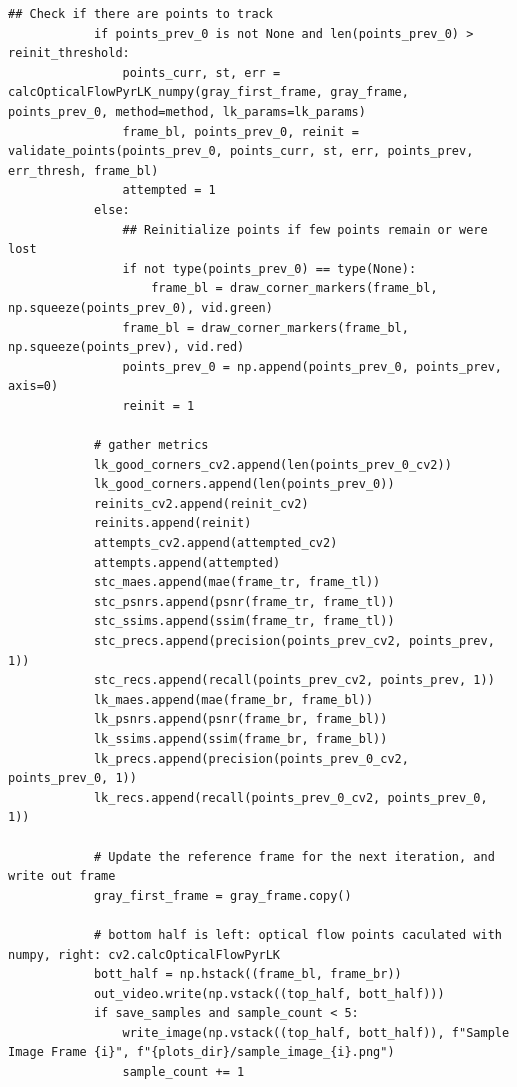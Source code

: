 \documentclass[11pt, conference, letterpaper]{IEEEtran}
\begin{document}
\begin{lstlisting}[style=python, caption={\texttt{lucas\_kanade.py}}, label={lst:lk}]
            ## Check if there are points to track
            if points_prev_0 is not None and len(points_prev_0) > reinit_threshold:
                points_curr, st, err = calcOpticalFlowPyrLK_numpy(gray_first_frame, gray_frame, points_prev_0, method=method, lk_params=lk_params)
                frame_bl, points_prev_0, reinit = validate_points(points_prev_0, points_curr, st, err, points_prev, err_thresh, frame_bl)
                attempted = 1
            else:
                ## Reinitialize points if few points remain or were lost
                if not type(points_prev_0) == type(None):
                    frame_bl = draw_corner_markers(frame_bl, np.squeeze(points_prev_0), vid.green)
                frame_bl = draw_corner_markers(frame_bl, np.squeeze(points_prev), vid.red)
                points_prev_0 = np.append(points_prev_0, points_prev, axis=0)
                reinit = 1
            
            # gather metrics
            lk_good_corners_cv2.append(len(points_prev_0_cv2))
            lk_good_corners.append(len(points_prev_0))
            reinits_cv2.append(reinit_cv2)
            reinits.append(reinit)
            attempts_cv2.append(attempted_cv2)
            attempts.append(attempted)
            stc_maes.append(mae(frame_tr, frame_tl))
            stc_psnrs.append(psnr(frame_tr, frame_tl))
            stc_ssims.append(ssim(frame_tr, frame_tl))
            stc_precs.append(precision(points_prev_cv2, points_prev, 1))
            stc_recs.append(recall(points_prev_cv2, points_prev, 1))
            lk_maes.append(mae(frame_br, frame_bl))
            lk_psnrs.append(psnr(frame_br, frame_bl))
            lk_ssims.append(ssim(frame_br, frame_bl))
            lk_precs.append(precision(points_prev_0_cv2, points_prev_0, 1))
            lk_recs.append(recall(points_prev_0_cv2, points_prev_0, 1))
            
            # Update the reference frame for the next iteration, and write out frame
            gray_first_frame = gray_frame.copy()
            
            # bottom half is left: optical flow points caculated with numpy, right: cv2.calcOpticalFlowPyrLK
            bott_half = np.hstack((frame_bl, frame_br))
            out_video.write(np.vstack((top_half, bott_half)))
            if save_samples and sample_count < 5:
                write_image(np.vstack((top_half, bott_half)), f"Sample Image Frame {i}", f"{plots_dir}/sample_image_{i}.png")
                sample_count += 1
                

\end{lstlisting}
\end{document}

